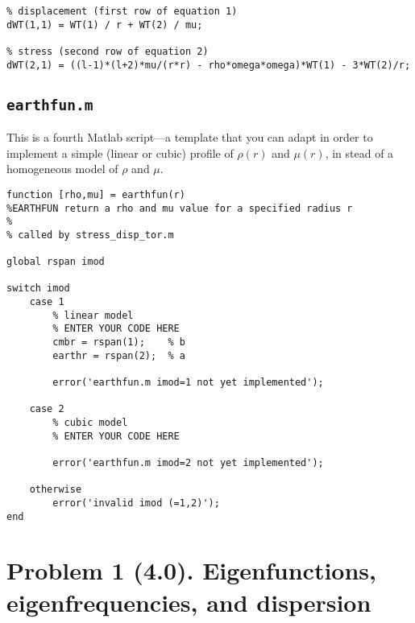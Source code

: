 \documentclass[11pt,titlepage,fleqn]{article}
\begin{document}
\begin{spacing}{1.0}
\begin{verbatim}
% displacement (first row of equation 1)
dWT(1,1) = WT(1) / r + WT(2) / mu;

% stress (second row of equation 2)
dWT(2,1) = ((l-1)*(l+2)*mu/(r*r) - rho*omega*omega)*WT(1) - 3*WT(2)/r;
\end{verbatim}
\normalsize


\subsection{\tt earthfun.m}
\label{sec:earthfun}

This is a fourth Matlab script---a template that you can adapt in order to implement a simple (linear or cubic) profile of $\rho(r)$ and $\mu(r)$, in stead of a homogeneous model of $\rho$ and $\mu$.
%
\small
\begin{verbatim}
function [rho,mu] = earthfun(r)
%EARTHFUN return a rho and mu value for a specified radius r
%
% called by stress_disp_tor.m

global rspan imod

switch imod
    case 1
        % linear model
        % ENTER YOUR CODE HERE
        cmbr = rspan(1);    % b
        earthr = rspan(2);  % a
        
        error('earthfun.m imod=1 not yet implemented');
        
    case 2
        % cubic model
        % ENTER YOUR CODE HERE
        
        error('earthfun.m imod=2 not yet implemented');
    
    otherwise
        error('invalid imod (=1,2)');
end
\end{verbatim}
\normalsize

\end{spacing}



\pagebreak
\section*{Problem 1 (4.0). Eigenfunctions, eigenfrequencies, and dispersion}
\end{document}
